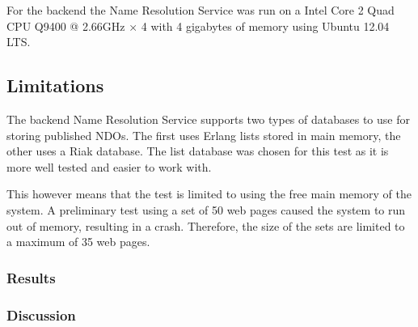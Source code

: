 For the backend the Name Resolution Service was run on a Intel Core 2 Quad CPU Q9400 @ 2.66GHz × 4 with 4 gigabytes of memory using Ubuntu 12.04 LTS.

\subsection{Limitations}

The backend Name Resolution Service supports two types of databases to use for storing published NDOs. The first uses Erlang lists stored in main memory, the other uses a Riak database. The list database was chosen for this test as it is more well tested and easier to work with.

This however means that the test is limited to using the free main memory of the system. A preliminary test using a set of 50 web pages caused the system to run out of memory, resulting in a crash. Therefore, the size of the sets are limited to a maximum of 35 web pages.

\subsubsection{Results}



\subsubsection{Discussion}
